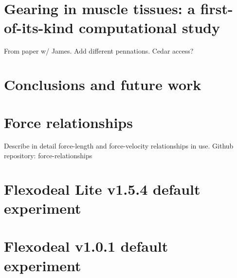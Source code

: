 \documentclass{sfuthesis}
\numberwithin{equation}{section}
\numberwithin{figure}{chapter}
\numberwithin{table}{chapter}
\theoremstyle{definition}
\begin{document}
\chapter{Gearing in muscle tissues: a first-of-its-kind computational study} \label{ch:gearing}

From paper w/ James. Add different pennations. Cedar access?



\chapter{Conclusions and future work}


%
%
%
%
%

\backmatter%
    
    

\begin{appendices} %

\chapter{Force relationships} \label{app:force_relationships}

Describe in detail force-length and force-velocity relationships in use.
Github repository: force-relationships

\chapter{Flexodeal Lite v1.5.4 default experiment} \label{app:default_flexodeal_lite}

\chapter{Flexodeal v1.0.1 default experiment} \label{app:default_flexodeal}


\end{appendices}
\end{document}
